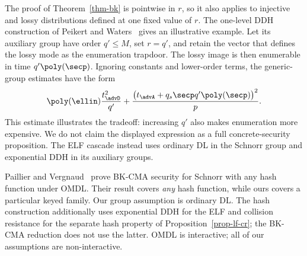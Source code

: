 The proof of Theorem~\ref{thm-bk} is pointwise in $r$, so it also applies to injective and lossy distributions defined at one fixed value of $r$. The one-level DDH construction of Peikert and Waters~\cite[Sections~5.2--5.3]{STOC:PeiWat08} gives an illustrative example. Let its auxiliary group have order $q'\le M$, set $r=q'$, and retain the vector that defines the lossy mode as the enumeration trapdoor. The lossy image is then enumerable in time $q'\poly(\secp)$. Ignoring constants and lower-order terms, the generic-group estimates have the form
$$
\poly(\ellin)\frac{t_{\advD}^2}{q'}
+
\frac{\bigl(t_{\advA}+q_s\secp q'\poly(\secp)\bigr)^2}{p}.
$$
This estimate illustrates the tradeoff: increasing $q'$ also makes enumeration more expensive. We do not claim the displayed expression as a full concrete-security proposition. The ELF cascade instead uses ordinary DL in the Schnorr group and exponential DDH in its auxiliary groups.

Paillier and Vergnaud~\cite{AC:PaiVer05} prove BK-CMA security for Schnorr with any hash function under OMDL. Their result covers \emph{any} hash function, while ours covers a particular keyed family. Our group assumption is ordinary DL. The hash construction additionally uses exponential DDH for the ELF and collision resistance for the separate hash property of Proposition~\ref{prop-lf-cr}; the BK-CMA reduction does not use the latter. OMDL is interactive; all of our assumptions are non-interactive.
